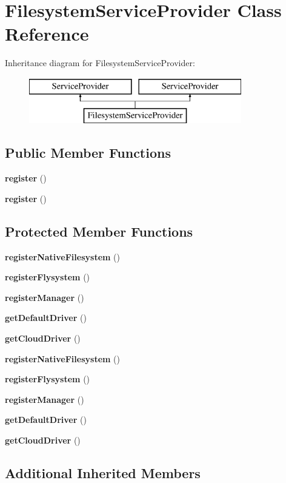 \section{Filesystem\+Service\+Provider Class Reference}
\label{class_illuminate_1_1_filesystem_1_1_filesystem_service_provider}
Inheritance diagram for Filesystem\+Service\+Provider\+:\begin{figure}[H]
\begin{center}
\leavevmode
\includegraphics[height=2.000000cm]{class_illuminate_1_1_filesystem_1_1_filesystem_service_provider}
\end{center}
\end{figure}
\subsection*{Public Member Functions}
\begin{DoxyCompactItemize}
\item 
{\bf register} ()
\item 
{\bf register} ()
\end{DoxyCompactItemize}
\subsection*{Protected Member Functions}
\begin{DoxyCompactItemize}
\item 
{\bf register\+Native\+Filesystem} ()
\item 
{\bf register\+Flysystem} ()
\item 
{\bf register\+Manager} ()
\item 
{\bf get\+Default\+Driver} ()
\item 
{\bf get\+Cloud\+Driver} ()
\item 
{\bf register\+Native\+Filesystem} ()
\item 
{\bf register\+Flysystem} ()
\item 
{\bf register\+Manager} ()
\item 
{\bf get\+Default\+Driver} ()
\item 
{\bf get\+Cloud\+Driver} ()
\end{DoxyCompactItemize}
\subsection*{Additional Inherited Members}


